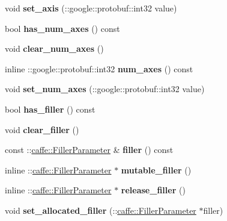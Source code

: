 \begin{DoxyCompactItemize}
void {\bfseries set\+\_\+axis} (\+::google\+::protobuf\+::int32 value)
\item 
\mbox{\label{classcaffe_1_1_bias_parameter_a89c0228f4a07380a38bf95293d9298af}} 
bool {\bfseries has\+\_\+num\+\_\+axes} () const
\item 
\mbox{\label{classcaffe_1_1_bias_parameter_a91fb5ba7176b7a693a08c76df5b3e1e5}} 
void {\bfseries clear\+\_\+num\+\_\+axes} ()
\item 
\mbox{\label{classcaffe_1_1_bias_parameter_a896d0392d84d35cc409dc17fb1bdc465}} 
inline \+::google\+::protobuf\+::int32 {\bfseries num\+\_\+axes} () const
\item 
\mbox{\label{classcaffe_1_1_bias_parameter_a3feb92b1ac71efe1be940319ffcfbe38}} 
void {\bfseries set\+\_\+num\+\_\+axes} (\+::google\+::protobuf\+::int32 value)
\item 
\mbox{\label{classcaffe_1_1_bias_parameter_ae3a95242f96890713709d2155b6497e3}} 
bool {\bfseries has\+\_\+filler} () const
\item 
\mbox{\label{classcaffe_1_1_bias_parameter_a965f8ab3974de8c91cbe859b58e4dc67}} 
void {\bfseries clear\+\_\+filler} ()
\item 
\mbox{\label{classcaffe_1_1_bias_parameter_a6c823fdaa7c6b09408d97a001514a565}} 
const \+::\mbox{\hyperlink{classcaffe_1_1_filler_parameter}{caffe\+::\+Filler\+Parameter}} \& {\bfseries filler} () const
\item 
\mbox{\label{classcaffe_1_1_bias_parameter_ae6107b39a8799a2282235285a773cf86}} 
inline \+::\mbox{\hyperlink{classcaffe_1_1_filler_parameter}{caffe\+::\+Filler\+Parameter}} $\ast$ {\bfseries mutable\+\_\+filler} ()
\item 
\mbox{\label{classcaffe_1_1_bias_parameter_a7bb256808a112518567c3e9e8846a80b}} 
inline \+::\mbox{\hyperlink{classcaffe_1_1_filler_parameter}{caffe\+::\+Filler\+Parameter}} $\ast$ {\bfseries release\+\_\+filler} ()
\item 
\mbox{\label{classcaffe_1_1_bias_parameter_a0d21642db0d36d01187ece40ba4e9b26}} 
void {\bfseries set\+\_\+allocated\+\_\+filler} (\+::\mbox{\hyperlink{classcaffe_1_1_filler_parameter}{caffe\+::\+Filler\+Parameter}} $\ast$filler)
\end{DoxyCompactItemize}
